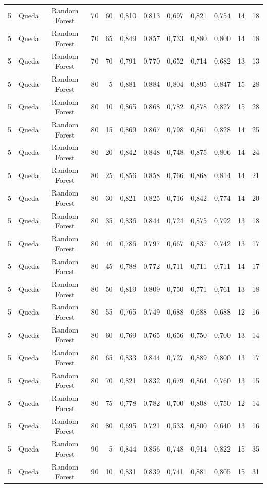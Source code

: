\begin{longtable}{ccclrrrrrrrr}
5 & Queda & Random Forest & 70 & 60 & 0,810 & 0,813 & 0,697 & 0,821 & 0,754 & 14 & 18 \\
5 & Queda & Random Forest & 70 & 65 & 0,849 & 0,857 & 0,733 & 0,880 & 0,800 & 14 & 18 \\
5 & Queda & Random Forest & 70 & 70 & 0,791 & 0,770 & 0,652 & 0,714 & 0,682 & 13 & 13 \\
5 & Queda & Random Forest & 80 & 5 & 0,881 & 0,884 & 0,804 & 0,895 & 0,847 & 15 & 28 \\
5 & Queda & Random Forest & 80 & 10 & 0,865 & 0,868 & 0,782 & 0,878 & 0,827 & 15 & 28 \\
5 & Queda & Random Forest & 80 & 15 & 0,869 & 0,867 & 0,798 & 0,861 & 0,828 & 14 & 25 \\
5 & Queda & Random Forest & 80 & 20 & 0,842 & 0,848 & 0,748 & 0,875 & 0,806 & 14 & 24 \\
5 & Queda & Random Forest & 80 & 25 & 0,856 & 0,858 & 0,766 & 0,868 & 0,814 & 14 & 21 \\
5 & Queda & Random Forest & 80 & 30 & 0,821 & 0,825 & 0,716 & 0,842 & 0,774 & 14 & 20 \\
5 & Queda & Random Forest & 80 & 35 & 0,836 & 0,844 & 0,724 & 0,875 & 0,792 & 13 & 18 \\
5 & Queda & Random Forest & 80 & 40 & 0,786 & 0,797 & 0,667 & 0,837 & 0,742 & 13 & 17 \\
5 & Queda & Random Forest & 80 & 45 & 0,788 & 0,772 & 0,711 & 0,711 & 0,711 & 14 & 17 \\
5 & Queda & Random Forest & 80 & 50 & 0,819 & 0,809 & 0,750 & 0,771 & 0,761 & 13 & 18 \\
5 & Queda & Random Forest & 80 & 55 & 0,765 & 0,749 & 0,688 & 0,688 & 0,688 & 12 & 16 \\
5 & Queda & Random Forest & 80 & 60 & 0,769 & 0,765 & 0,656 & 0,750 & 0,700 & 13 & 14 \\
5 & Queda & Random Forest & 80 & 65 & 0,833 & 0,844 & 0,727 & 0,889 & 0,800 & 13 & 17 \\
5 & Queda & Random Forest & 80 & 70 & 0,821 & 0,832 & 0,679 & 0,864 & 0,760 & 13 & 15 \\
5 & Queda & Random Forest & 80 & 75 & 0,778 & 0,782 & 0,700 & 0,808 & 0,750 & 12 & 14 \\
5 & Queda & Random Forest & 80 & 80 & 0,695 & 0,721 & 0,533 & 0,800 & 0,640 & 13 & 16 \\
5 & Queda & Random Forest & 90 & 5 & 0,844 & 0,856 & 0,748 & 0,914 & 0,822 & 15 & 35 \\
5 & Queda & Random Forest & 90 & 10 & 0,831 & 0,839 & 0,741 & 0,881 & 0,805 & 15 & 31 \\

\end{longtable}
